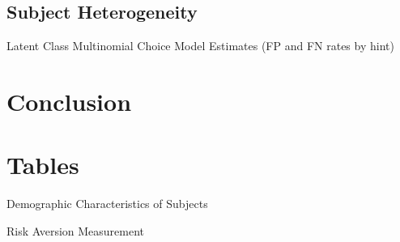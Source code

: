 \documentclass[12pt,a4paper]{article}
\begin{document}
\newpage
\singlespacing
\small

\subsection{Subject Heterogeneity}


\begin{table}[H]
\caption{Latent Class Multinomial Choice Model Estimates (FP and FN rates by hint)}

\end{table}

%










\section{Conclusion}


\clearpage





\appendix

\newpage
\section{Tables}


\begin{table}[h!]
\caption{Demographic Characteristics of Subjects} \label{summ_tab}

\end{table}

\begin{table}[h!]
\caption{Risk Aversion Measurement} \label{ra_tab}

\end{table}





 \label{ip_tab}




\end{document}
